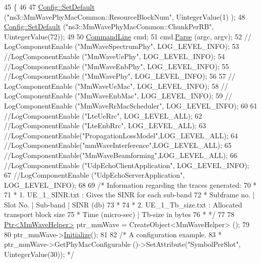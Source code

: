 \begin{DoxyCode}
45 \{
46 
47         \hyperlink{group__config_ga2e7882df849d8ba4aaad31c934c40c06}{Config::SetDefault} (\textcolor{stringliteral}{"ns3::MmWavePhyMacCommon::ResourceBlockNum"}, UintegerValue(1)
      );
48         \hyperlink{group__config_ga2e7882df849d8ba4aaad31c934c40c06}{Config::SetDefault} (\textcolor{stringliteral}{"ns3::MmWavePhyMacCommon::ChunkPerRB"}, UintegerValue(72));
49 
50   \hyperlink{classns3_1_1CommandLine}{CommandLine} cmd;
51   cmd.\hyperlink{classns3_1_1CommandLine_a5c10b85b3207e5ecb48d907966923156}{Parse} (argc, argv);
52 \textcolor{comment}{//  LogComponentEnable ("MmWaveSpectrumPhy", LOG\_LEVEL\_INFO);}
53   \textcolor{comment}{//LogComponentEnable ("MmWaveUePhy", LOG\_LEVEL\_INFO);}
54   \textcolor{comment}{//LogComponentEnable ("MmWaveEnbPhy", LOG\_LEVEL\_INFO);}
55   \textcolor{comment}{//LogComponentEnable ("MmWavePhy", LOG\_LEVEL\_INFO);}
56 
57 \textcolor{comment}{//  LogComponentEnable ("MmWaveUeMac", LOG\_LEVEL\_INFO);}
58 \textcolor{comment}{//  LogComponentEnable ("MmWaveEnbMac", LOG\_LEVEL\_INFO);}
59 \textcolor{comment}{//  LogComponentEnable ("MmWaveRrMacScheduler", LOG\_LEVEL\_INFO);}
60 
61   \textcolor{comment}{//LogComponentEnable ("LteUeRrc", LOG\_LEVEL\_ALL);}
62   \textcolor{comment}{//LogComponentEnable ("LteEnbRrc", LOG\_LEVEL\_ALL);}
63   \textcolor{comment}{//LogComponentEnable("PropagationLossModel",LOG\_LEVEL\_ALL);}
64   \textcolor{comment}{//LogComponentEnable("mmWaveInterference",LOG\_LEVEL\_ALL);}
65   \textcolor{comment}{//LogComponentEnable("MmWaveBeamforming",LOG\_LEVEL\_ALL);}
66   \textcolor{comment}{//LogComponentEnable ("UdpEchoClientApplication", LOG\_LEVEL\_INFO);}
67   \textcolor{comment}{//LogComponentEnable ("UdpEchoServerApplication", LOG\_LEVEL\_INFO);}
68 
69   \textcolor{comment}{/* Information regarding the traces generated:}
70 \textcolor{comment}{   *}
71 \textcolor{comment}{   * 1. UE\_1\_SINR.txt : Gives the SINR for each sub-band}
72 \textcolor{comment}{   *    Subframe no.  | Slot No. | Sub-band  | SINR (db)}
73 \textcolor{comment}{   *}
74 \textcolor{comment}{   * 2. UE\_1\_Tb\_size.txt : Allocated transport block size}
75 \textcolor{comment}{   *    Time (micro-sec)  |  Tb-size in bytes}
76 \textcolor{comment}{   * */}
77 
78   \hyperlink{classns3_1_1Ptr}{Ptr<MmWaveHelper>} ptr\_mmWave = CreateObject<MmWaveHelper> ();
79 
80   ptr\_mmWave->\hyperlink{classns3_1_1Object_af4411cb29971772fcd09203474a95078}{Initialize}();
81 
82   \textcolor{comment}{/* A configuration example.}
83 \textcolor{comment}{   * ptr\_mmWave->GetPhyMacConfigurable ()->SetAttribute("SymbolPerSlot", UintegerValue(30)); */}

\end{DoxyCode}
